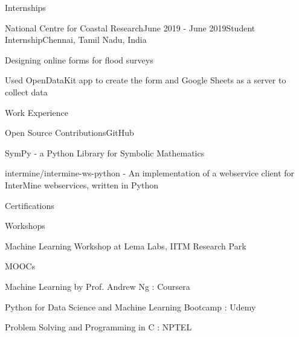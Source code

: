 \documentclass{resume} %
\begin{document}
\begin{rSection}{Internships}
	
	\begin{rSubsection}{National Centre for Coastal Research}{June 2019 - June 2019}{Student Internship}{Chennai, Tamil Nadu, India}
		\item Designing online forms for flood surveys
		\item Used OpenDataKit app to create the form and Google Sheets as a server to collect data 
		
	\end{rSubsection}
	
	
\end{rSection}

\iffalse

\begin{rSection}{Work Experience}
	
	\begin{rSubsection}{Open Source Contributions}{}{GitHub}{}
		\item SymPy - a Python Library for Symbolic Mathematics 
		\item intermine/intermine-ws-python - An implementation of a webservice client for InterMine webservices, written in Python
		
	\end{rSubsection}	
	
\end{rSection}



\begin{rSection}{Certifications}
	
	\begin{rSubsection}{Workshops}{}{}{}
		\item Machine Learning Workshop at Lema Labs, IITM Research Park	
	\end{rSubsection}
	
	\begin{rSubsection}{MOOCs}{}{}{}
		\item Machine Learning by Prof. Andrew Ng : Coursera
		\item Python for Data Science and Machine Learning Bootcamp : Udemy
		\item Problem Solving and Programming in C : NPTEL
		\smallskip \\
		
	\end{rSubsection}
	
		
	
	
	
\end{rSection}
\end{document}
